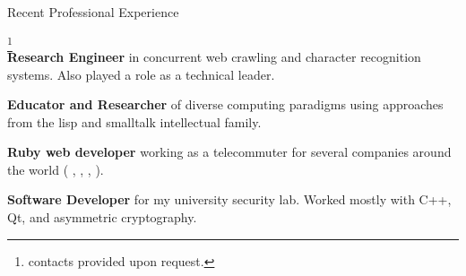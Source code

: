 \begin{rubric}{Recent Professional Experience}{
  \footnote{contacts provided upon request.}  \\
  
  \entry*[2010 - Present] \textbf{Research Engineer} in concurrent web
  crawling and character recognition systems. Also played a role as a
  technical leader.

  \entry*[2009] \textbf{Educator and Researcher} of diverse computing
  paradigms using approaches from the lisp and smalltalk intellectual
  family.

  \entry*[2007-2009] \textbf{Ruby web developer} working as a
  telecommuter for several companies around the world (
  ,
  ,
  ,
  ).

  \entry*[2005 - 2007] \textbf{Software Developer} for my university
  security lab. Worked mostly with C++, Qt, and asymmetric
  cryptography.

}\end{rubric}

